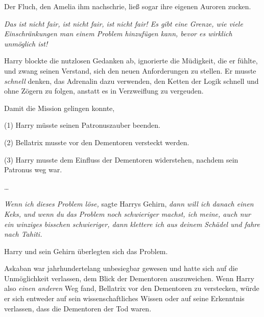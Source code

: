 Der Fluch, den Amelia ihm nachschrie, ließ sogar ihre eigenen Auroren zucken.

\later

\emph{Das ist nicht fair, ist nicht fair, ist nicht fair! Es gibt eine Grenze, wie viele Einschränkungen man einem Problem hinzufügen kann, bevor es wirklich unmöglich ist!}

Harry blockte die nutzlosen Gedanken ab, ignorierte die Müdigkeit, die er fühlte, und zwang seinen Verstand, sich den neuen Anforderungen zu stellen. Er musste \emph{schnell} denken, das Adrenalin dazu verwenden, den Ketten der Logik schnell und ohne Zögern zu folgen, anstatt es in Verzweiflung zu vergeuden.

Damit die Mission gelingen konnte,

(1) Harry müsste seinen Patronuszauber beenden.

(2) Bellatrix musste vor den Dementoren versteckt werden.

(3) Harry musste dem Einfluss der Dementoren widerstehen, nachdem sein Patronus weg war.

…

\emph{Wenn ich dieses Problem löse,} sagte Harrys Gehirn, \emph{dann will ich danach einen Keks, und wenn du das Problem noch schwieriger machst, ich meine, auch nur ein winziges bisschen schwieriger, dann klettere ich aus deinem Schädel und fahre nach Tahiti.}

Harry und sein Gehirn überlegten sich das Problem.

Askaban war jahrhundertelang unbesiegbar gewesen und hatte sich auf die Unmöglichkeit verlassen, dem Blick der Dementoren auszuweichen. Wenn Harry also \emph{einen anderen} Weg fand, Bellatrix vor den Dementoren zu verstecken, würde er sich entweder auf sein wissenschaftliches Wissen oder auf seine Erkenntnis verlassen, dass die Dementoren der Tod waren.

